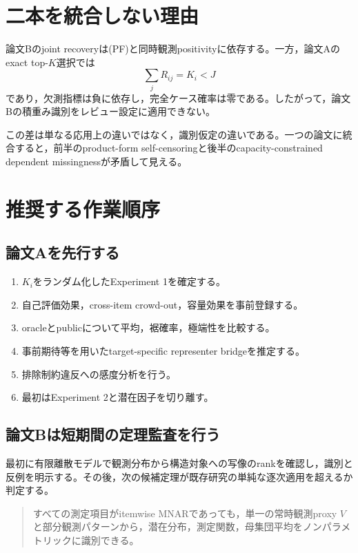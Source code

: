 \documentclass[a4paper,11pt,xelatex,ja=standard]{bxjsarticle}
\begin{document}
\section{二本を統合しない理由}

論文Bのjoint recoveryは(PF)と同時観測positivityに依存する。一方，論文Aのexact top-$K$選択では
\[
\sum_jR_{ij}=K_i<J
\]
であり，欠測指標は負に依存し，完全ケース確率は零である。したがって，論文Bの積重み識別をレビュー設定に適用できない。

この差は単なる応用上の違いではなく，識別仮定の違いである。一つの論文に統合すると，前半のproduct-form self-censoringと後半のcapacity-constrained dependent missingnessが矛盾して見える。

\section{推奨する作業順序}

\subsection{論文Aを先行する}
\begin{enumerate}
  \item $K_i$をランダム化したExperiment 1を確定する。
  \item 自己評価効果，cross-item crowd-out，容量効果を事前登録する。
  \item oracleとpublicについて平均，裾確率，極端性を比較する。
  \item 事前期待等を用いたtarget-specific representer bridgeを推定する。
  \item 排除制約違反への感度分析を行う。
  \item 最初はExperiment 2と潜在因子を切り離す。
\end{enumerate}

\subsection{論文Bは短期間の定理監査を行う}

最初に有限離散モデルで観測分布から構造対象への写像のrankを確認し，識別と反例を明示する。その後，次の候補定理が既存研究の単純な逐次適用を超えるか判定する。

\begin{quote}
すべての測定項目がitemwise MNARであっても，単一の常時観測proxy $V$ と部分観測パターンから，潜在分布，測定関数，母集団平均をノンパラメトリックに識別できる。
\end{quote}
\end{document}
